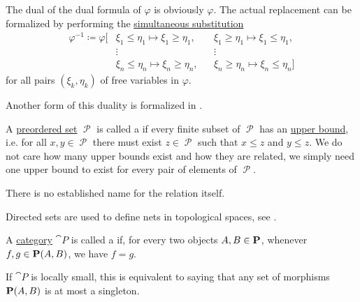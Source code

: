 \begin{definition}
\begin{thmenum}[series=def:preordered_set]
    The dual of the dual formula of \( \varphi \) is obviously \( \varphi \). The actual replacement can be formalized by performing the \hyperref[def:first_order_substitution/term_in_formula]{simultaneous substitution}
    \begin{equation*}
      \begin{aligned}
        \varphi^{-1} \coloneqq \varphi[
          &\xi_1 \leq \eta_1 \mapsto \xi_1 \geq \eta_1, &&\xi_1 \geq \eta_1 \mapsto \xi_1 \leq \eta_1, \\
          &\vdots                                       &&\vdots \\
          &\xi_n \leq \eta_n \mapsto \xi_n \geq \eta_n, &&\xi_n \geq \eta_n \mapsto \xi_n \leq \eta_n]
      \end{aligned}
    \end{equation*}
    for all pairs \( (\xi_k, \eta_k) \) of free variables in \( \varphi \).

    Another form of this duality is formalized in .
  \end{thmenum}
\end{definition}

\begin{definition}\label{def:directed_set}
  A \hyperref[def:preordered_set]{preordered set} \( \mscrP \) is called a  if every finite subset of \( \mscrP \) has an \hyperref[def:poset_extremal_points/upper_and_lower_bounds]{upper bound}, i.e. for all \( x, y \in \mscrP \) there must exist \( z \in \mscrP \) such that \( x \leq z \) and \( y \leq z \). We do not care how many upper bounds exist and how they are related, we simply need one upper bound to exist for every pair of elements of \( \mscrP \).

  There is no established name for the relation itself.

  Directed sets are used to define nets in topological spaces, see .
\end{definition}

\begin{definition}\label{def:thin_category}
  A \hyperref[def:category]{category} \( \cat{P} \) is called a  if, for every two objects \( A, B \in \operatorname{\mathbf{P}} \), whenever \( f, g \in \operatorname{\mathbf{P}}(A, B) \), we have \( f = g \).

  If \( \cat{P} \) is locally small, this is equivalent to saying that any set of morphisms \( \operatorname{\mathbf{P}}(A, B) \) is at most a singleton.
\end{definition}

